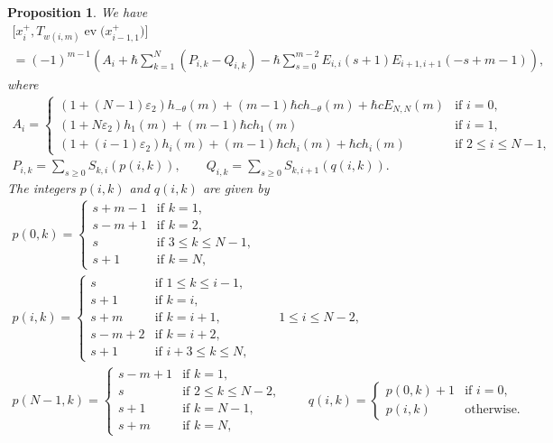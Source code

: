 \documentclass[11pt]{article}
\newtheorem{prop}[thm]{Proposition}
\theoremstyle{definition}
\numberwithin{equation}{section}
\DeclareMathOperator{\ev}{ev}
\newcommand{\ve}{\varepsilon}
\begin{document}
\begin{prop}\label{prop:braket}
We have
\begin{gather}
\big[x_i^+, T_{w(i,m)} \ev\big(x_{i-1,1}^+\big)\big] \nonumber\\
= (-1)^{m-1} \left(A_i + \hbar \sum_{k=1}^N (P_{i,k}-Q_{i,k}) - \hbar \sum_{s=0}^{m-2} E_{i,i}(s+1)E_{i+1,i+1}(-s+m-1) \right),\label{eq:braket}
\end{gather}
where
\begin{gather*}
A_i = \begin{cases}
(1+(N-1)\ve_2)h_{-\theta}(m) + (m-1)\hbar ch_{-\theta}(m)+ \hbar c E_{N,N}(m) & \text{if $i=0$}, \\
(1+N\ve_2)h_1(m) + (m-1)\hbar ch_{1}(m)& \text{if $i=1$}, \\
(1+(i-1)\ve_2)h_{i}(m) + (m-1)\hbar ch_{i}(m) + \hbar c h_{i}(m) & \text{if $2 \leq i \leq N-1$},
\end{cases}
\\
P_{i,k} = \sum_{s \geq 0} S_{k,i}(p(i,k)), \qquad Q_{i,k} = \sum_{s \geq 0} S_{k,i+1}(q(i,k)).
\end{gather*}
The integers $p(i,k)$ and $q(i,k)$ are given by
\begin{gather*}
p(0,k)= \begin{cases}
s+m-1 & \text{if $k=1$},\\
s-m+1 & \text{if $k=2$},\\
s & \text{if $3 \leq k \leq N-1$},\\
s+1 & \text{if $k=N$},
\end{cases}\\
p(i,k)= \begin{cases}
s & \text{if $1 \leq k \leq i-1$},\\
s+1 & \text{if $k=i$},\\
s+m & \text{if $k=i+1$},\\
s-m+2 & \text{if $k=i+2$},\\
s+1 & \text{if $i+3 \leq k \leq N$},
\end{cases}\qquad 1 \leq i \leq N-2,\\
p(N-1,k)= \begin{cases}
s-m+1 & \text{if $k=1$},\\
s & \text{if $2 \leq k \leq N-2$},\\
s+1 & \text{if $k=N-1$},\\
s+m & \text{if $k=N$},
\end{cases}\qquad
q(i,k)=\begin{cases}
p(0,k)+1 & \text{if $i=0$},\\
p(i,k) &\text{otherwise}.
\end{cases}
\end{gather*}
\end{prop}
\end{document}
